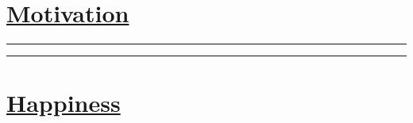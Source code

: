 \documentclass[11pt]{article}
\begin{document}
\begin{multicols}{2}

\section*{\underline{Motivation}}
\vfill\null
\vfill\null
\begin{flushleft}
\rule{125pt}{1pt}\vline\rule{125pt}{1pt}
\end{flushleft}



\section*{\underline{Happiness}}
\vfill\null
\smallskip
\vfill\null

\end{multicols}
 
\end{document}
